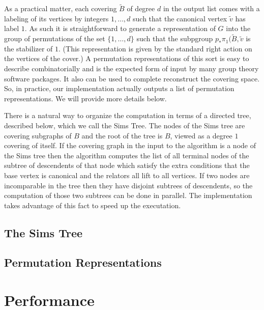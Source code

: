 \documentclass[12pt]{article}
\theoremstyle{definition}
\renewcommand{\tilde}{\widetilde}
\begin{document}
    As a practical matter, each covering $\tilde B$ of degree $d$ in the output
    list comes with a labeling of its vertices by integers $1, \ldots, d$ such
    that the canonical vertex $\tilde v$ has label $1$.  As such it is straightforward to
    generate a representation of $G$ into the group of permutations of the set
    $\{1, \ldots, d\}$ such that the subpgroup $p_*\pi_1(\tilde B, \tilde v$ is
    the stabilizer of $1$.  (This representation is given by the standard right action
    on the vertices of the cover.)  A permutation representations of this sort is
    easy to describe combinatorially and is the expected form of input by many
    group theory software packages.  It also can be used to complete reconstruct
    the covering space.  So, in practice, our implementation actually outputs a
    list of permutation representations.  We will provide more details below.
    
    There is a natural way to organize the computation in terms of a directed
    tree, described below, which we call the Sims Tree.  The nodes of the Sims
    tree are covering subgraphs of $B$ and the root of the tree is $B$, viewed
    as a degree $1$ covering of itself.  If the covering graph in the input to
    the algorithm is a node of the Sims tree then the algorithm computes the
    list of all terminal nodes of the subtree of descendents of that node which
    satisfy the extra conditions that the base vertex is canonical and the
    relators all lift to all vertices.  If two nodes are incomparable in the
    tree then they have disjoint subtrees of descendents, so the computation of
    those two subtrees can be done in parallel.  The implementation takes
    advantage of this fact to speed up the executation.
    
   \subsection{The Sims Tree}

   \subsection{Permutation Representations}

\section{Performance}
\end{document}
